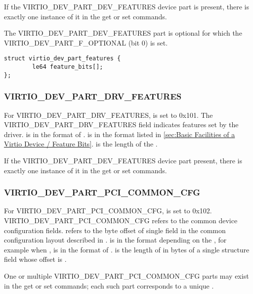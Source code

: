 If the VIRTIO_DEV_PART_DEV_FEATURES device part is present, there is exactly
one instance of it in the get or set commands.

The VIRTIO_DEV_PART_DEV_FEATURES part is optional for which
the VIRTIO_DEV_PART_F_OPTIONAL (bit 0)  is set.

\begin{lstlisting}
struct virtio_dev_part_features {
        le64 feature_bits[];
};
\end{lstlisting}

\subsubsection{VIRTIO_DEV_PART_DRV_FEATURES}
\label{sec:Basic Facilities of a Virtio Device / Device parts / Common device parts / VIRTIO_DEV_PART_DRV_FEATURES}

For VIRTIO_DEV_PART_DRV_FEATURES,  is set to 0x101.
The VIRTIO_DEV_PART_DRV_FEATURES field indicates features set by the driver.
 is in the format of .
 is in the format listed in
\ref{sec:Basic Facilities of a Virtio Device / Feature Bits}.
 is the length of the .

If the VIRTIO_DEV_PART_DEV_FEATURES device part present, there is exactly
one instance of it in the get or set commands.

\subsubsection{VIRTIO_DEV_PART_PCI_COMMON_CFG}
\label{sec:Basic Facilities of a Virtio Device / Device parts / Common device parts / VIRTIO_DEV_PART_PCI_COMMON_CFG}

For VIRTIO_DEV_PART_PCI_COMMON_CFG,  is set to 0x102.
VIRTIO_DEV_PART_PCI_COMMON_CFG refers to the common device configuration
fields.  refers to the
byte offset of single field in the common configuration layout described in
.  is in the format depending on
the , for example when , 
is in the format of .  is the length of
 in bytes of a single structure field whose offset is .

One or multiple VIRTIO_DEV_PART_PCI_COMMON_CFG parts may exist in the
get or set commands; each such part corresponds to a unique .

